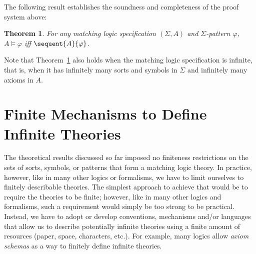 \documentclass[UTF8,11pt]{article}
\newcounter{thmcounter}
\theoremstyle{plain}
\newtheorem{theorem}    [thmcounter]{Theorem}
\theoremstyle{definition}
\theoremstyle{remark}
\begin{document}
The following result establishes the soundness and completeness
of the proof system above:

\begin{theorem}\cite{rosu-2017-lmcs}
\label{thm:completeness}
For any matching logic specification $(\Sigma,A)$ and $\Sigma$-pattern
$\varphi$, $A \models \varphi$ iff $\sequent{A}{\varphi}$.
\end{theorem}

Note that Theorem~\ref{thm:completeness} also holds when the matching logic
specification is infinite, that is, when it has infinitely many sorts and
symbols in $\Sigma$ and infinitely many axioms in $A$.


\section{Finite Mechanisms to Define Infinite Theories}
\label{sec:finite-mechanisms}

The theoretical results discussed so far imposed no finiteness
restrictions on the sets of sorts, symbols, or patterns that form a matching
logic theory.
In practice, however, like in many other logics or formalisms, we have to
limit ourselves to finitely describable theories.
The simplest approach to achieve that would be to require the theories to be
finite; however, like in many other logics and formalisms, such a requirement
would simply be too strong to be practical.
Instead, we have to adopt or develop conventions, mechanisms and/or languages
that allow us to describe potentially infinite theories using a finite amount
of resources (paper, space, characters, etc.).
For example, many logics allow \emph{axiom schemas} as a way to finitely
define infinite theories.
\end{document}
